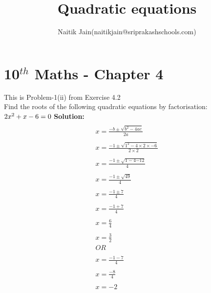 \documentclass[12pt]{article}
\title{Quadratic equations}
\author{Naitik Jain(naitikjain@sriprakashschools.com)}
\newcommand{\solution}{\noindent \textbf{Solution: }}
\begin{document}
\section*{10$^{th}$ Maths - Chapter 4}
This is Problem-1(ii) from Exercise 4.2\\
Find the roots of the following quadratic equations by factorisation:\\
${{2}x^2+ {x} -{6} }= 0\\$
\solution\\
\begin{align}
\\x=\frac{-b\pm\sqrt{b^2-4ac}}{2a}\\
\\x=\frac{-1\pm\sqrt{1^2-4 \times 2\times -6}}{2 \times 2}\\
\\x=\frac{-1\pm\sqrt{1-{4}{-12}}}{4}\\
\\x=\frac{-1\pm\sqrt{49}}{4}\\
\\x=\frac{-1\pm{7}}{4}\\
\\x=\frac{-1+7}{4}\\
\\x=\frac{6}{4}\\
\\x=\frac{3}{2}\\
OR\\
\\x=\frac{-1-7}{4}\\
\\x=\frac{-8}{4}\\
\\x=-2
\end{align}
\end{document}
